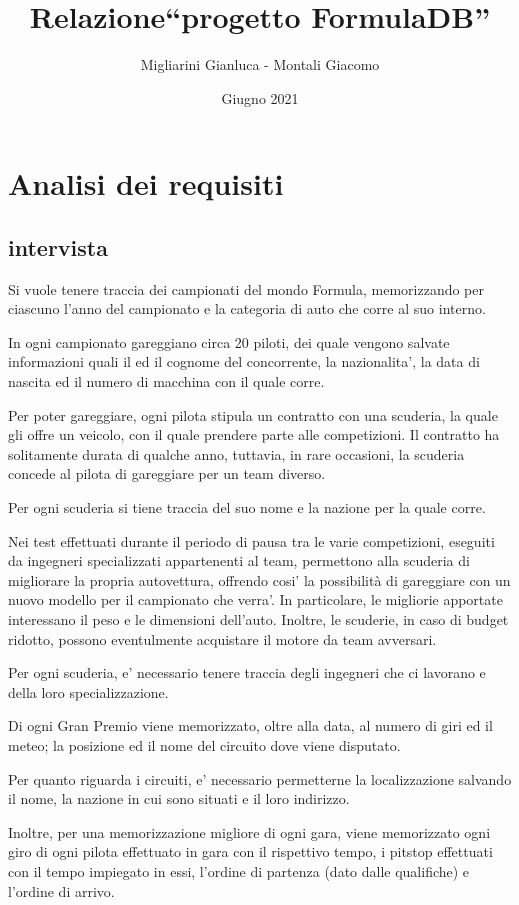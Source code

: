 \documentclass[a4paper,12pt]{report}
\title{Relazione\break``progetto FormulaDB''}
\author{Migliarini Gianluca - Montali Giacomo}
\date{Giugno 2021}
\begin{document}
	
\maketitle
\chapter{Analisi dei requisiti}
	\section{intervista}
		Si vuole tenere traccia dei campionati del mondo Formula, memorizzando per ciascuno l'anno del campionato e la categoria di auto che corre al suo interno.
		
		In ogni campionato gareggiano circa 20 piloti, dei quale vengono salvate informazioni quali il ed il cognome del concorrente,
		la nazionalita', la data di nascita ed il numero di macchina con il quale corre.
		
		Per poter gareggiare, ogni pilota stipula un contratto con una scuderia, la quale gli offre un veicolo, con il quale
		prendere parte alle competizioni. Il contratto ha solitamente durata di qualche anno, tuttavia, in rare occasioni,
		la scuderia concede al pilota di gareggiare per un team diverso.
		
		Per ogni scuderia si tiene traccia del suo nome e la nazione per la quale corre.
		
		Nei test effettuati durante il periodo di pausa tra le varie competizioni, eseguiti da ingegneri specializzati appartenenti al team,
		permettono alla scuderia di migliorare la propria autovettura, offrendo cosi' la possibilità di gareggiare
		con un nuovo modello per il campionato che verra'. In particolare, le migliorie apportate interessano il peso e le dimensioni dell'auto.
		Inoltre, le scuderie, in caso di budget ridotto, possono eventulmente acquistare il motore da team avversari.
		
		Per ogni scuderia, e' necessario tenere traccia degli ingegneri che ci lavorano e della loro specializzazione.
		
		Di ogni Gran Premio viene memorizzato, oltre alla data, al numero di giri ed il meteo;
		la posizione ed il nome del circuito dove viene disputato.
		
		Per quanto riguarda i circuiti, e' necessario permetterne la localizzazione salvando il nome, la nazione in cui sono situati e il loro indirizzo.
		
		Inoltre, per una memorizzazione migliore di ogni gara, viene memorizzato ogni giro di ogni pilota effettuato in gara con il rispettivo tempo,
		i pitstop effettuati con il tempo impiegato in essi, l'ordine di partenza (dato dalle qualifiche) e l'ordine di arrivo.
		
\end{document}

